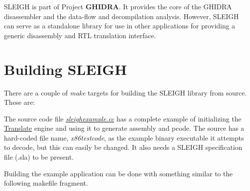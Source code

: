S\+L\+E\+I\+GH is part of Project {\bfseries{G\+H\+I\+D\+RA}}. It provides the core of the G\+H\+I\+D\+RA disassembler and the data-\/flow and decompilation analysis. However, S\+L\+E\+I\+GH can serve as a standalone library for use in other applications for providing a generic disassembly and R\+TL translation interface.\hypertarget{sleigh_sleighbuild}{}\section{Building S\+L\+E\+I\+GH}\label{sleigh_sleighbuild}
There are a couple of {\itshape make} targets for building the S\+L\+E\+I\+GH library from source. These are\+:


\begin{DoxyCode}{0}
\DoxyCodeLine{}
\end{DoxyCode}


The source code file {\itshape \mbox{\hyperlink{sleighexample_8cc}{sleighexample.\+cc}}} has a complete example of initializing the \mbox{\hyperlink{class_translate}{Translate}} engine and using it to generate assembly and pcode. The source has a hard-\/coded file name, {\itshape x86testcode}, as the example binary executable it attempts to decode, but this can easily be changed. It also needs a S\+L\+E\+I\+GH specification file ({\itshape }.sla) to be present.

Building the example application can be done with something similar to the following makefile fragment.


